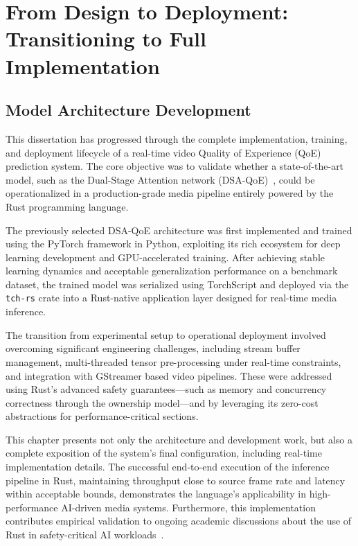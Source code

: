 \chapter{From Design to Deployment: Transitioning to Full Implementation} \label{chap:ch3}

\section{Model Architecture Development}

This dissertation has progressed through the complete implementation, training, and deployment lifecycle of a real-time video Quality of Experience (QoE) prediction system. The core objective was to validate whether a state-of-the-art model, such as the Dual-Stage Attention network (DSA-QoE)~\cite{jia2024continuous}, could be operationalized in a production-grade media pipeline entirely powered by the Rust programming language.

The previously selected DSA-QoE architecture was first implemented and trained using the PyTorch framework in Python, exploiting its rich ecosystem for deep learning development and GPU-accelerated training. After achieving stable learning dynamics and acceptable generalization performance on a benchmark dataset, the trained model was serialized using TorchScript and deployed via the \texttt{tch-rs} crate into a Rust-native application layer designed for real-time media inference.

The transition from experimental setup to operational deployment involved overcoming significant engineering challenges, including stream buffer management, multi-threaded tensor pre-processing under real-time constraints, and integration with GStreamer based video pipelines. These were addressed using Rust’s advanced safety guarantees—such as memory and concurrency correctness through the ownership model—and by leveraging its zero-cost abstractions for performance-critical sections.

This chapter presents not only the architecture and development work, but also a complete exposition of the system’s final configuration, including real-time implementation details. The successful end-to-end execution of the inference pipeline in Rust, maintaining throughput close to source frame rate and latency within acceptable bounds, demonstrates the language’s applicability in high-performance AI-driven media systems. Furthermore, this implementation contributes empirical validation to ongoing academic discussions about the use of Rust in safety-critical AI workloads~\cite{fulton2022benefits, johansson2023transitioning, carnelos2025microflow}.

